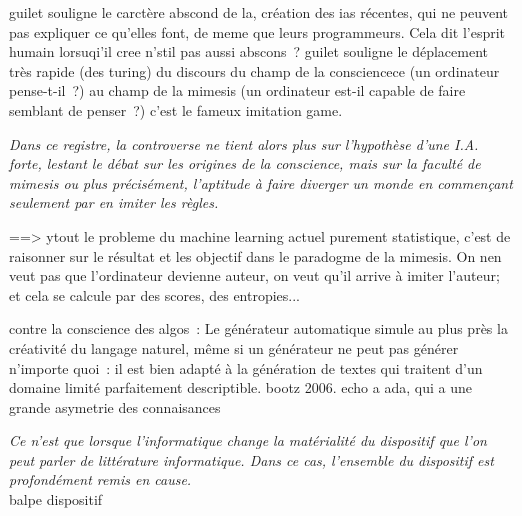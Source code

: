 \documentclass{article}
\newenvironment{citationbox}
{\begin{center}
		\begin{minipage}{.8\textwidth}
		}
		{
		\end{minipage}	
\end{center}
}
\begin{document}
		
		guilet souligne le carctère abscond de la, création des ias récentes, qui ne peuvent pas expliquer ce qu'elles font, de meme que leurs programmeurs. Cela dit l'esprit humain lorsuqi'il cree n'stil pas aussi abscons~?
		guilet souligne le déplacement très rapide (des turing) du discours du champ de la consciencece (un ordinateur pense-t-il~?) au champ de la mimesis (un ordinateur est-il capable de faire semblant de penser~?) c'est le fameux imitation game.
		\begin{citationbox}
			\textit{Dans ce registre, la controverse ne tient alors plus sur l'hypothèse d'une I.A. forte, lestant le débat sur les origines de la conscience, mais sur la faculté de mimesis ou plus précisément, l'aptitude à faire diverger un monde en commençant seulement par en imiter les règles.}
		\end{citationbox}
		==> ytout le probleme du machine learning actuel purement statistique, c'est de raisonner sur le résultat et les objectif dans le paradogme de la mimesis. On nen veut pas que l'ordinateur devienne auteur, on veut qu'il arrive à imiter l'auteur; et cela se calcule par des scores, des entropies...
		
		
		
		contre la conscience des algos~: Le générateur automatique simule au plus près la
		créativité du langage naturel, même si un générateur ne peut pas générer n'importe
		quoi~: il est bien adapté à la génération de textes qui traitent d'un domaine limité
		parfaitement descriptible. bootz 2006. echo a ada, qui a une grande asymetrie des connaisances
		\begin{citationbox}
			\textit{Ce n'est que lorsque l'informatique change la matérialité du dispositif que l'on peut parler de littérature informatique. Dans ce cas, l'ensemble du dispositif est profondément remis en cause.}\\
			balpe dispositif
		\end{citationbox}
		
		
\end{document}
